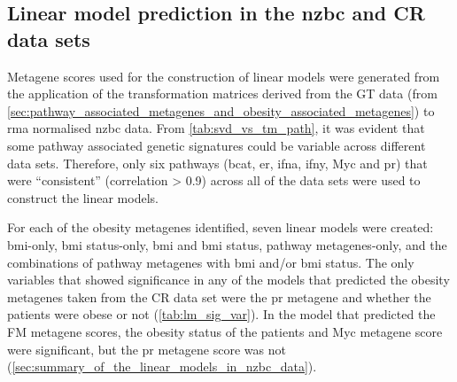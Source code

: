 \subsection{Linear model prediction in the \gls{nzbc} and CR data sets}
\label{sub:linear_model_prediction_in_the_nzbc_and_cr_data_sets}

Metagene scores used for the construction of linear models were generated from the application of the transformation matrices derived from the GT data (from \cref{sec:pathway_associated_metagenes_and_obesity_associated_metagenes}) to \gls{rma} normalised \gls{nzbc} data.
From \cref{tab:svd_vs_tm_path}, it was evident that some pathway associated genetic signatures could be variable across different data sets.
Therefore, only six pathways (\gls{bcat}, \gls{er}, \gls{ifna}, \gls{ifny}, Myc and \gls{pr}) that were ``consistent'' (correlation \textgreater{} 0.9) across all of the data sets were used to construct the linear models.

For each of the obesity metagenes identified, seven linear models were created: \gls{bmi}-only, \gls{bmi} status-only, \gls{bmi} and \gls{bmi} status, pathway metagenes-only, and the combinations of pathway metagenes with \gls{bmi} and/or \gls{bmi} status.
The only variables that showed significance in any of the models that predicted the obesity metagenes taken from the CR data set were the \gls{pr} metagene and whether the patients were obese or not (\cref{tab:lm_sig_var}).
In the model that predicted the FM metagene scores, the obesity status of the patients and Myc metagene score were significant, but the \gls{pr} metagene score was not (\cref{sec:summary_of_the_linear_models_in_nzbc_data}).

